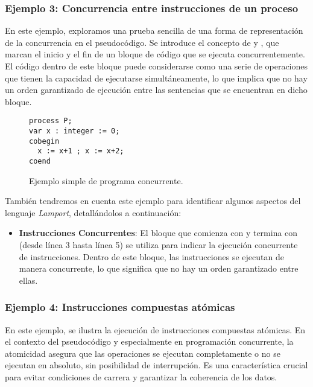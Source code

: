 \subsubsection{Ejemplo 3: Concurrencia entre instrucciones de un proceso}\label{subsubsec:pseudoAnalisisEjemplo3}
En este ejemplo, exploramos una prueba sencilla de una forma de representación de la concurrencia en el pseudocódigo. Se introduce el concepto de  y , que marcan el inicio y el fin de un bloque de código que se ejecuta concurrentemente. El código dentro de este bloque puede considerarse como una serie de operaciones que tienen la capacidad de ejecutarse simultáneamente, lo que implica que no hay un orden garantizado de ejecución entre las sentencias que se encuentran en dicho bloque.

\begin{figure}[h]
\begin{lstlisting}[style=lamportStyle]
process P;
var x : integer := 0;
cobegin
  x := x+1 ; x := x+2;
coend
\end{lstlisting}
\caption{Ejemplo simple de programa concurrente.}
\label{fig:ejemplo3}
\end{figure}

También tendremos en cuenta este ejemplo para identificar algunos aspectos del lenguaje \textit{Lamport}, detallándolos a continuación:

\begin{itemize}
    \item \textbf{Instrucciones Concurrentes}: El bloque que comienza con  y termina con  (desde línea 3 hasta línea 5) se utiliza para indicar la ejecución concurrente de instrucciones. Dentro de este bloque, las instrucciones se ejecutan de manera concurrente, lo que significa que no hay un orden garantizado entre ellas.
\end{itemize}

\subsubsection{Ejemplo 4: Instrucciones compuestas atómicas}\label{subsubsec:pseudoAnalisisEjemplo4}

En este ejemplo, se ilustra la ejecución de instrucciones compuestas atómicas. En el contexto del pseudocódigo y especialmente en programación concurrente, la atomicidad asegura que las operaciones se ejecutan completamente o no se ejecutan en absoluto, sin posibilidad de interrupción. Es una característica crucial para evitar condiciones de carrera y garantizar la coherencia de los datos.

